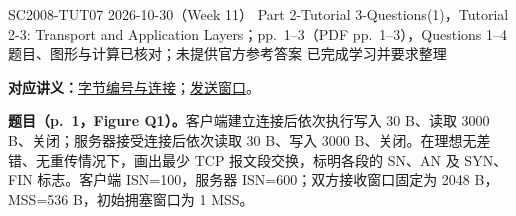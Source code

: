 \begingroup
\renewcommand{\recordid}[1]{}
\renewcommand{\relatedtopic}[2]{\hyperref[topic:#1]{#2}}
\label{tutorial:SC2008-TUT07}

\tutorialmeta
  {SC2008-TUT07}
  {2026-10-30（Week 11）}
  {Part 2-Tutorial 3-Questions(1)，Tutorial 2-3: Transport and Application Layers；pp.~1--3（PDF pp.~1--3），Questions 1--4}
  {题目、图形与计算已核对；未提供官方参考答案}
  {已完成学习并要求整理}

\linespread{1.1}\selectfont
\setlength{\parskip}{0.3em}
\setlength{\topsep}{0.3em}

\textbf{对应讲义：}\relatedtopic{SC2008-L08-T02}{字节编号与连接}；\relatedtopic{SC2008-L08-T03}{发送窗口}。

\textbf{题目（p.~1，Figure Q1）。}客户端建立连接后依次执行写入 30 B、读取 3000 B、关闭；服务器接受连接后依次读取 30 B、写入 3000 B、关闭。在理想无差错、无重传情况下，画出最少 TCP 报文段交换，标明各段的 SN、AN 及 SYN、FIN 标志。客户端 ISN=100，服务器 ISN=600；双方接收窗口固定为 2048 B，MSS=536 B，初始拥塞窗口为 1 MSS。

